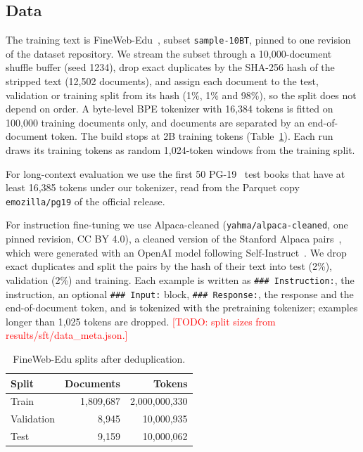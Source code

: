 \documentclass[conference]{IEEEtran}
\newcommand{\todo}[1]{\textcolor{red}{[TODO: #1]}}
\begin{document}
\subsection{Data}
The training text is FineWeb-Edu~\cite{penedo2024fineweb}, subset \texttt{sample-10BT}, pinned to one
revision of the dataset repository. We stream the subset through a 10,000-document shuffle buffer
(seed 1234), drop exact duplicates by the SHA-256 hash of the stripped text (12,502 documents), and
assign each document to the test, validation or training split from its hash (1\%, 1\% and 98\%), so
the split does not depend on order. A byte-level BPE tokenizer with 16,384 tokens is fitted on 100,000
training documents only, and documents are separated by an end-of-document token. The build stops at
2B training tokens (Table~\ref{tab:data}). Each run draws its training tokens as random 1,024-token
windows from the training split.

For long-context evaluation we use the first 50 PG-19~\cite{rae2020compressive} test books that have
at least 16,385 tokens under our tokenizer, read from the Parquet copy \texttt{emozilla/pg19} of the
official release.

For instruction fine-tuning we use Alpaca-cleaned (\texttt{yahma/alpaca-cleaned}, one pinned revision,
CC BY 4.0), a cleaned version of the Stanford Alpaca pairs~\cite{taori2023alpaca}, which were generated
with an OpenAI model following Self-Instruct~\cite{wang2023selfinstruct}. We drop exact duplicates and
split the pairs by the hash of their text into test (2\%), validation (2\%) and training. Each example
is written as \texttt{\#\#\# Instruction:}, the instruction, an optional \texttt{\#\#\# Input:} block,
\texttt{\#\#\# Response:}, the response and the end-of-document token, and is tokenized with the
pretraining tokenizer; examples longer than 1,025 tokens are dropped.
\todo{split sizes from results/sft/data\_meta.json.}

\begin{table}[t]
\centering
\caption{FineWeb-Edu splits after deduplication.}
\label{tab:data}
\begin{tabular}{lrr}
\toprule
Split & Documents & Tokens \\
\midrule
Train & 1,809,687 & 2,000,000,330 \\
Validation & 8,945 & 10,000,935 \\
Test & 9,159 & 10,000,062 \\
\bottomrule
\end{tabular}
\end{table}
\end{document}
